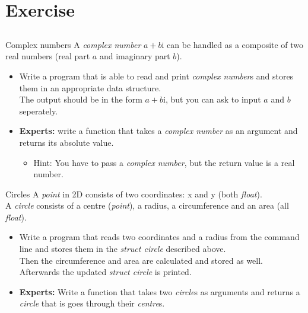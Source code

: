 \section{Exercise}
\subsection{}
\begin{frame}{Complex numbers}
	A \textit{complex number} $a + b\mathrm{i}$ can be handled as a composite of two real numbers (real part $a$ and imaginary part $b$).
	\begin{itemize}
		\item Write a program that is able to read and print \textit{complex number}s and stores them in an appropriate data structure.
		\\ The output should be in the form $a + b\mathrm{i}$, but you can ask to input $a$ and $b$ seperately.
		\item \textbf{Experts:} write a function that takes a \textit{complex number} as an argument and returns its absolute value.
		\begin{itemize}
			\item<2-> Hint: You have to pass a \textit{complex number}, but the return value is a real number.
		\end{itemize}
	\end{itemize}
\end{frame}
\begin{frame}{Circles}
	A \textit{point} in 2D consists of two coordinates: x and y (both \textit{float}). \\
	A \textit{circle} consists of a centre (\textit{point}), a radius, a circumference and an area (all \textit{float}).
	\begin{itemize}
		\item Write a program that reads two coordinates and a radius from the command line and stores them in the \textit{struct circle} described above.
		\\Then the circumference and area are calculated and stored as well.
		\\ Afterwards the updated \textit{struct circle} is printed.
		\item \textbf{Experts:} Write a function that takes two \textit{circle}s as arguments and returns a \textit{circle} that is goes through their \textit{centre}s.
	\end{itemize}
\end{frame}


